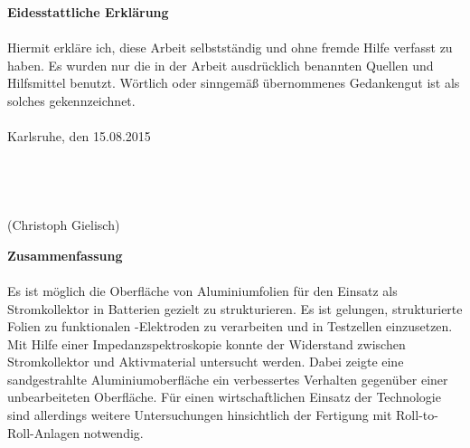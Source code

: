 \documentclass[a4paper, 11pt, headsepline,footsepline,twoside,abstract]{scrbook}
\begin{document}
\setcounter{page}{1}
\textbf{\Large{Eidesstattliche Erklärung}}
\\\\
Hiermit erkläre ich, diese Arbeit selbstständig und ohne fremde Hilfe verfasst zu haben. Es wurden nur die in der Arbeit ausdrücklich benannten Quellen und Hilfsmittel benutzt. Wörtlich oder sinngemäß übernommenes Gedankengut ist als solches gekennzeichnet.
\\\\
Karlsruhe, den 15.08.2015
\\\\
\\\\
\\
(Christoph Gielisch) 
 
\newpage

\setcounter{page}{1}
\textbf{\Large{Zusammenfassung}}
\\\\
Es ist möglich die Oberfläche von Aluminiumfolien für den Einsatz als Stromkollektor in Batterien gezielt zu strukturieren. Es ist gelungen, strukturierte Folien zu funktionalen -Elektroden zu verarbeiten und in Testzellen einzusetzen. Mit Hilfe einer Impedanzspektroskopie konnte der Widerstand zwischen Stromkollektor und Aktivmaterial untersucht werden. Dabei zeigte eine sandgestrahlte Aluminiumoberfläche ein verbessertes Verhalten gegenüber einer unbearbeiteten Oberfläche. Für einen wirtschaftlichen Einsatz der Technologie sind allerdings weitere Untersuchungen hinsichtlich der Fertigung mit Roll-to-Roll-Anlagen notwendig.
\pagestyle{toc}
\renewcommand*{\chapterpagestyle}{toc} %
\tableofcontents
{} 
\newpage
\cleardoubleemptypage
\pagestyle{normal}
\renewcommand*{\chapterpagestyle}{plain}
\setcounter{page}{1}
\end{document}
